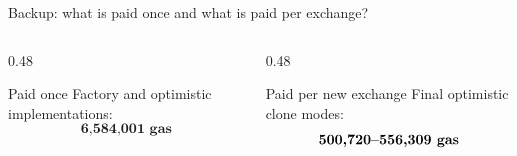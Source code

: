 \documentclass[aspectratio=169,10pt]{beamer}
\newcommand{\gas}[1]{\textbf{#1 gas}}
\begin{document}
\begin{frame}{Backup: what is paid once and what is paid per exchange?}
  \begin{columns}[T,onlytextwidth]
    \begin{column}{0.48\textwidth}
      \begin{block}{Paid once}
        Factory and optimistic implementations:
        \[
          \gas{6,584,001}
        \]
      \end{block}
    \end{column}
    \begin{column}{0.48\textwidth}
      \begin{block}{Paid per new exchange}
        Final optimistic clone modes:
        \[
          \gas{500,720\text{--}556,309}
        \]
      \end{block}
    \end{column}
  \end{columns}
\end{frame}
\end{document}
